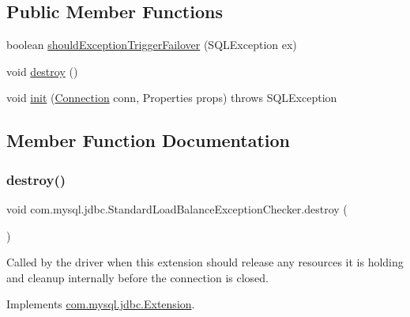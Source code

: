 \subsection*{Public Member Functions}
\begin{DoxyCompactItemize}
\item 
boolean \mbox{\hyperlink{classcom_1_1mysql_1_1jdbc_1_1_standard_load_balance_exception_checker_ae94fdd274579d8507853e5f32e0a948a}{should\+Exception\+Trigger\+Failover}} (S\+Q\+L\+Exception ex)
\item 
void \mbox{\hyperlink{classcom_1_1mysql_1_1jdbc_1_1_standard_load_balance_exception_checker_a4e65985d73071a946e9b3f825de794ca}{destroy}} ()
\item 
void \mbox{\hyperlink{classcom_1_1mysql_1_1jdbc_1_1_standard_load_balance_exception_checker_ac8bb8f4e7d1e80c79687b68336eeae15}{init}} (\mbox{\hyperlink{interfacecom_1_1mysql_1_1jdbc_1_1_connection}{Connection}} conn, Properties props)  throws S\+Q\+L\+Exception 
\end{DoxyCompactItemize}


\subsection{Member Function Documentation}
\mbox{\label{classcom_1_1mysql_1_1jdbc_1_1_standard_load_balance_exception_checker_a4e65985d73071a946e9b3f825de794ca}} 
\subsubsection{\texorpdfstring{destroy()}{destroy()}}
{\footnotesize\ttfamily void com.\+mysql.\+jdbc.\+Standard\+Load\+Balance\+Exception\+Checker.\+destroy (\begin{DoxyParamCaption}{ }\end{DoxyParamCaption})}

Called by the driver when this extension should release any resources it is holding and cleanup internally before the connection is closed. 

Implements \mbox{\hyperlink{interfacecom_1_1mysql_1_1jdbc_1_1_extension_a7d9644de305efed5df71f3fcc7cc1772}{com.\+mysql.\+jdbc.\+Extension}}.

